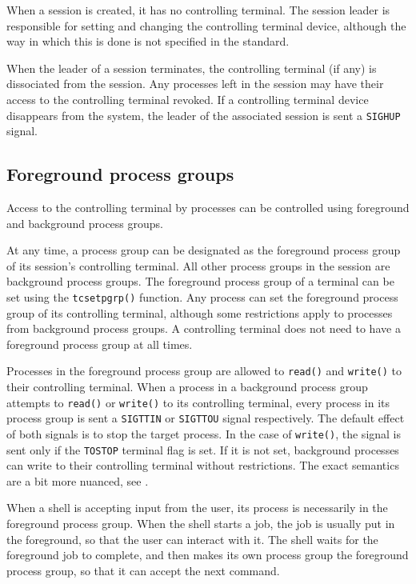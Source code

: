 \documentclass[shortabstract, manyadvisors, english, mgr]{iithesis}
\begin{document}
When a session is created, it has no controlling terminal. The session leader is
responsible for setting and changing the controlling terminal device, although
the way in which this is done is not specified in the standard.

When the leader of a session terminates, the controlling terminal (if any) is
dissociated from the session. Any processes left in the session may have their
access to the controlling terminal revoked. If a controlling terminal device
disappears from the system, the leader of the associated session is sent a
\texttt{SIGHUP} signal.

\subsection{Foreground process groups}
Access to the controlling terminal by processes can be controlled using
foreground and background process groups.

At any time, a process group can be designated as the foreground process group
of its session's controlling terminal. All other process groups in the session
are background process groups. The foreground process group of a terminal can be
set using the \texttt{tcsetpgrp()}\cite{tcsetpgrp} function. Any process can set the foreground
process group of its controlling terminal, although some restrictions apply to
processes from background process groups. A controlling terminal does not need
to have a foreground process group at all times.

Processes in the foreground process group are allowed to \texttt{read()} and
\texttt{write()} to their controlling terminal. When a process in a background
process group attempts to \texttt{read()} or \texttt{write()} to its controlling
terminal, every process in its process group is sent a \texttt{SIGTTIN} or
\texttt{SIGTTOU} signal respectively. The default effect of both signals is to
stop the target process. In the case of \texttt{write()}, the signal is sent
only if the \texttt{TOSTOP} terminal flag is set. If it is not set, background
processes can write to their controlling terminal without restrictions. The
exact semantics are a bit more nuanced, see \cite{terminal-access}.

When a shell is accepting input from the user, its process is necessarily in the
foreground process group. When the shell starts a job, the job is usually put in
the foreground, so that the user can interact with it. The shell waits for the
foreground job to complete, and then makes its own process group the foreground
process group, so that it can accept the next command.
\end{document}
